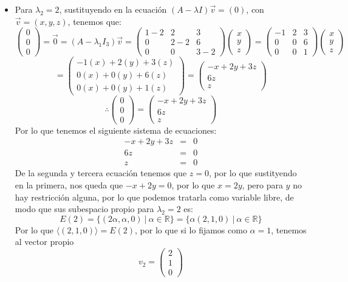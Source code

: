 \begin{itemize}
\begin{itemize}
\item Para $\lambda_2=2$, sustituyendo en la ecuaci\'on $(A-\lambda I)\vec{v}=(0)$, con $\vec{v}=(x,y,z)$, tenemos que:
    \[\begin{pmatrix}0\\
0\\0\end{pmatrix}=\vec{0}=(A-\lambda_1I_{3})\vec{v}=\begin{pmatrix}
    1-2 & 2 & 3\\
    0 & 2-2 & 6\\
    0 & 0 & 3-2\end{pmatrix}\begin{pmatrix}x\\
y\\z\end{pmatrix}=\begin{pmatrix}
    -1 & 2 & 3\\
    0 & 0 & 6\\
    0 & 0 & 1\end{pmatrix}\begin{pmatrix}x\\
y\\z\end{pmatrix}\]\[=\begin{pmatrix}-1(x)+2(y)+3(z)\\0(x)+0(y)+6(z)\\0(x)+0(y)+1(z)\end{pmatrix}=\begin{pmatrix}-x+2y+3z\\6z\\z\end{pmatrix}\]
\[\therefore \begin{pmatrix}0\\
0\\0\end{pmatrix}=\begin{pmatrix}-x+2y+3z\\6z\\z\end{pmatrix}\]
Por lo que tenemos el siguiente sistema de ecuaciones:
\begin{eqnarray*}
-x+2y+3z&=&0\\6z&=&0\\z&=&0\end{eqnarray*}
De la segunda y tercera ecuaci\'on tenemos que $z=0$, por lo que sustityendo en la primera, nos queda que $-x+2y=0$, por lo que $x=2y$, pero para $y$ no hay restricci\'on alguna, por lo que podemos tratarla como variable libre, de modo que sus subespacio propio para $\lambda_2=2$ es:
\[E(2)=\{(2\alpha,\alpha,0)~|~\alpha\in \mathbb{R}\}=\{\alpha(2,1,0)~|~\alpha\in \mathbb{R}\}\]
Por lo que $\langle(2,1,0)\rangle=E(2)$, por lo que si lo fijamos como $\alpha=1$, tenemos al vector propio
\[v_2=\begin{pmatrix}2\\1\\0\end{pmatrix}\]


\end{itemize}
\end{itemize}
